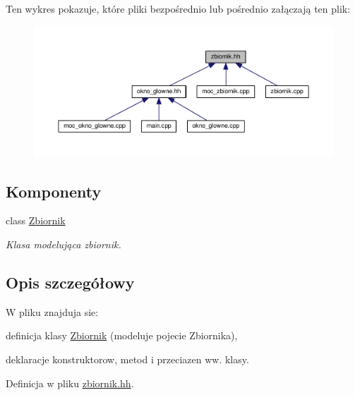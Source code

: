 Ten wykres pokazuje, które pliki bezpośrednio lub pośrednio załączają ten plik\-:\nopagebreak
\begin{figure}[H]
\begin{center}
\leavevmode
\includegraphics[width=350pt]{zbiornik_8hh__dep__incl}
\end{center}
\end{figure}
\subsection*{Komponenty}
\begin{DoxyCompactItemize}
\item 
class \hyperlink{class_zbiornik}{Zbiornik}
\begin{DoxyCompactList}\small\item\em Klasa modelująca zbiornik. \end{DoxyCompactList}\end{DoxyCompactItemize}


\subsection{Opis szczegółowy}
W pliku znajduja sie\-:
\begin{DoxyItemize}
\item definicja klasy \hyperlink{class_zbiornik}{Zbiornik} (modeluje pojecie Zbiornika),
\item deklaracje konstruktorow, metod i przeciazen ww. klasy. 
\end{DoxyItemize}

Definicja w pliku \hyperlink{zbiornik_8hh_source}{zbiornik.\-hh}.


